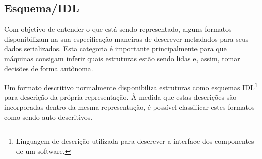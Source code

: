 \subsection[Esquema/IDL]{Esquema/IDL}

Com objetivo de entender o que está sendo representado, alguns formatos disponibilizam na sua especificação maneiras de descrever metadados para seus dados serializados. Esta categoria é importante principalmente para que máquinas consigam inferir quais estruturas estão sendo lidas e, assim, tomar decisões de forma autônoma.

Um formato descritivo normalmente disponibiliza estruturas como esquemas IDL\footnote{
  Linguagem de descrição utilizada para descrever a interface dos componentes de um software.
} para descrição da própria representação. À medida que estas descrições são incorporadas dentro da mesma representação, é possível classificar estes formatos como sendo auto-descritivos. \cite{Rentachintala2014}
